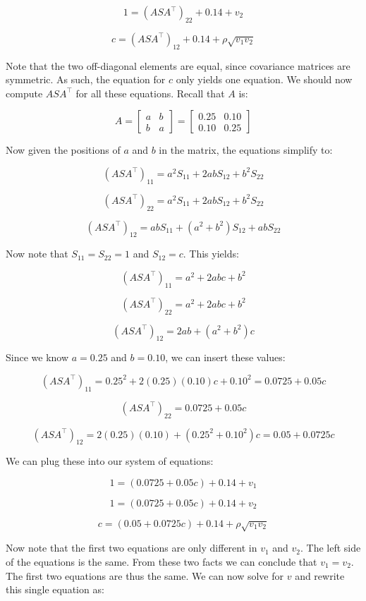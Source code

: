 \documentclass{article}
\begin{document}
\[
1 = (ASA^\top)_{22} + 0.14 + v_2
\]

\[
c = (ASA^\top)_{12} + 0.14 + \rho\sqrt{v_1 v_2}
\]

\noindent
Note that the two off-diagonal elements are equal, since covariance matrices are symmetric. As such,
the equation for $c$ only yields one equation. We should now compute $ASA^\top$ for all these equations.
Recall that $A$ is:

\[
A = \begin{bmatrix} a & b \\ b & a \end{bmatrix}
= \begin{bmatrix} 0.25 & 0.10 \\ 0.10 & 0.25 \end{bmatrix}
\]

\noindent
Now given the positions of $a$ and $b$ in the matrix, the equations simplify to:

\[
(ASA^\top)_{11} = a^2S_{11} + 2abS_{12} + b^2S_{22}
\]

\[
(ASA^\top)_{22} = a^2S_{11} + 2abS_{12} + b^2S_{22}
\]

\[
(ASA^\top)_{12} = abS_{11} + (a^2 + b^2)S_{12} + abS_{22}
\]

\noindent
Now note that $S_{11} = S_{22} = 1$ and $S_{12} = c$. This yields:

\[
(ASA^\top)_{11} = a^2 + 2abc + b^2
\]

\[
(ASA^\top)_{22} = a^2 + 2abc + b^2
\]

\[
(ASA^\top)_{12} = 2ab + (a^2 + b^2)c
\]

\noindent
Since we know $a=0.25$ and $b=0.10$, we can insert these values:

\[
(ASA^\top)_{11} = 0.25^2 + 2(0.25)(0.10)c + 0.10^2 = 0.0725 + 0.05c
\]

\[
(ASA^\top)_{22} = 0.0725 + 0.05c
\]

\[
(ASA^\top)_{12} = 2(0.25)(0.10) + (0.25^2 + 0.10^2)c = 0.05 + 0.0725c
\]

\noindent
We can plug these into our system of equations:

\[
1 = (0.0725 + 0.05c) + 0.14 + v_1
\]

\[
1 = (0.0725 + 0.05c) + 0.14 + v_2
\]

\[
c = (0.05 + 0.0725c) + 0.14 + \rho\sqrt{v_1 v_2}
\]

\noindent
Now note that the first two equations are only different in $v_1$ and $v_2$. The left side of the equations is the same. 
From these two facts we can conclude that $v_1 = v_2$. The first two equations are thus the same. We can now solve for $v$ 
and rewrite this single equation as:
\end{document}

